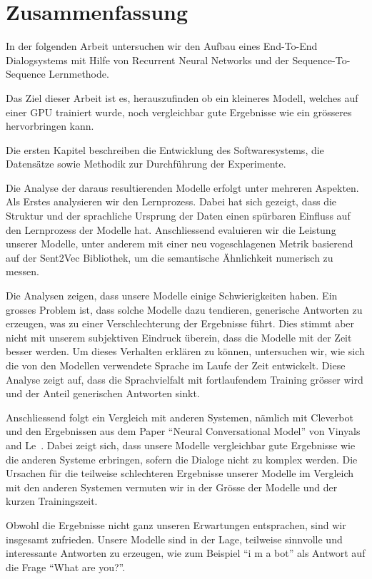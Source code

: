 \chapter*{Zusammenfassung}
In der folgenden Arbeit untersuchen wir den Aufbau eines End-To-End Dialogsystems mit Hilfe von Recurrent Neural Networks und der Sequence-To-Sequence Lernmethode.

Das Ziel dieser Arbeit ist es, herauszufinden ob ein kleineres Modell, welches auf einer GPU trainiert wurde, noch vergleichbar gute Ergebnisse wie ein grösseres hervorbringen kann.

Die ersten Kapitel beschreiben die Entwicklung des Softwaresystems, die Datensätze sowie Methodik zur Durchführung der Experimente.

Die Analyse der daraus resultierenden Modelle erfolgt unter mehreren Aspekten. Als Erstes analysieren wir den Lernprozess. Dabei hat sich gezeigt, dass die Struktur und der sprachliche Ursprung der Daten einen spürbaren Einfluss auf den Lernprozess der Modelle hat. Anschliessend evaluieren wir die Leistung unserer Modelle, unter anderem mit einer neu vogeschlagenen Metrik basierend auf der Sent2Vec Bibliothek, um die semantische Ähnlichkeit numerisch zu messen.

Die Analysen zeigen, dass unsere Modelle einige Schwierigkeiten haben. Ein grosses Problem ist, dass solche Modelle dazu tendieren, generische Antworten zu erzeugen, was zu einer Verschlechterung der Ergebnisse führt. Dies stimmt aber nicht mit unserem subjektiven Eindruck überein, dass die Modelle mit der Zeit besser werden. Um dieses Verhalten erklären zu können, untersuchen wir, wie sich die von den Modellen verwendete Sprache im Laufe der Zeit entwickelt. Diese Analyse zeigt auf, dass die Sprachvielfalt mit fortlaufendem Training grösser wird und der Anteil generischen Antworten sinkt.

Anschliessend folgt ein Vergleich mit anderen Systemen, nämlich mit Cleverbot und den Ergebnissen aus dem Paper ``Neural Conversational Model'' von Vinyals and Le~\cite{Vinyals:2015}. Dabei zeigt sich, dass unsere Modelle vergleichbar gute Ergebnisse wie die anderen Systeme erbringen, sofern die Dialoge nicht zu komplex werden. Die Ursachen für die teilweise schlechteren Ergebnisse unserer Modelle im Vergleich mit den anderen Systemen vermuten wir in der Grösse der Modelle und der kurzen Trainingszeit.

Obwohl die Ergebnisse nicht ganz unseren Erwartungen entsprachen, sind wir insgesamt zufrieden. Unsere Modelle sind in der Lage, teilweise sinnvolle und interessante Antworten zu erzeugen, wie zum Beispiel ``i m a bot'' als Antwort auf die Frage ``What are you?''.